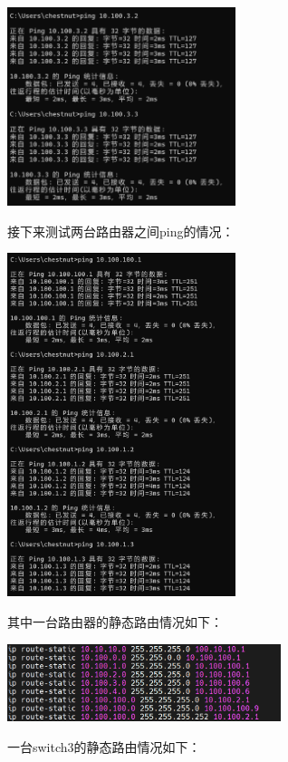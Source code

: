 \documentclass{article}
\begin{document}
\vspace{10pt}
\centerline{\includegraphics[width=0.5\textwidth]{4_1_images/3.png}}
\vspace{10pt}

接下来测试两台路由器之间ping的情况：

\vspace{10pt}
\centerline{\includegraphics[width=0.5\textwidth]{4_1_images/4.png}}
\vspace{10pt}

其中一台路由器的静态路由情况如下：

\vspace{10pt}
\centerline{\includegraphics[width=0.6\textwidth]{4_1_images/2.png}}
\vspace{10pt}

一台switch3的静态路由情况如下：
\end{document}
